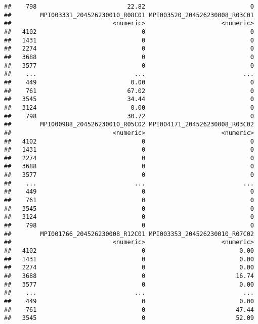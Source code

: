 \documentclass[
]{article}
\begin{document}
\begin{verbatim}
##    798                         22.82                             0
##        MPI003331_204526230010_R08C01 MPI003520_204526230008_R03C01
##                            <numeric>                     <numeric>
##   4102                             0                             0
##   1431                             0                             0
##   2274                             0                             0
##   3688                             0                             0
##   3577                             0                             0
##    ...                           ...                           ...
##    449                          0.00                             0
##    761                         67.02                             0
##   3545                         34.44                             0
##   3124                          0.00                             0
##    798                         30.72                             0
##        MPI000988_204526230010_R05C02 MPI004171_204526230008_R03C02
##                            <numeric>                     <numeric>
##   4102                             0                             0
##   1431                             0                             0
##   2274                             0                             0
##   3688                             0                             0
##   3577                             0                             0
##    ...                           ...                           ...
##    449                             0                             0
##    761                             0                             0
##   3545                             0                             0
##   3124                             0                             0
##    798                             0                             0
##        MPI001766_204526230008_R12C01 MPI003353_204526230010_R07C02
##                            <numeric>                     <numeric>
##   4102                             0                          0.00
##   1431                             0                          0.00
##   2274                             0                          0.00
##   3688                             0                         16.74
##   3577                             0                          0.00
##    ...                           ...                           ...
##    449                             0                          0.00
##    761                             0                         47.44
##   3545                             0                         52.09

\end{verbatim}
\end{document}
